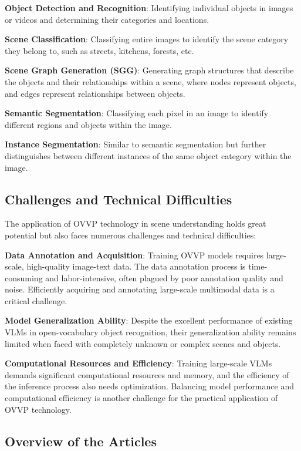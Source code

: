 \textbf{Object Detection and Recognition}: Identifying individual objects in images or videos and determining their categories and locations.

\textbf{Scene Classification}: Classifying entire images to identify the scene category they belong to, such as streets, kitchens, forests, etc.

\textbf{Scene Graph Generation (SGG)}: Generating graph structures that describe the objects and their relationships within a scene, where nodes represent objects, and edges represent relationships between objects.

\textbf{Semantic Segmentation}: Classifying each pixel in an image to identify different regions and objects within the image.

\textbf{Instance Segmentation}: Similar to semantic segmentation but further distinguishes between different instances of the same object category within the image.







\subsection{Challenges and Technical Difficulties}

The application of OVVP technology in scene understanding holds great potential but also faces numerous challenges and technical difficulties:

\textbf{Data Annotation and Acquisition}: Training OVVP models requires large-scale, high-quality image-text data. The data annotation process is time-consuming and labor-intensive, often plagued by poor annotation quality and noise. Efficiently acquiring and annotating large-scale multimodal data is a critical challenge.

\textbf{Model Generalization Ability}: Despite the excellent performance of existing VLMs in open-vocabulary object recognition, their generalization ability remains limited when faced with completely unknown or complex scenes and objects.

\textbf{Computational Resources and Efficiency}: Training large-scale VLMs demands significant computational resources and memory, and the efficiency of the inference process also needs optimization. Balancing model performance and computational efficiency is another challenge for the practical application of OVVP technology.


\subsection{Overview of the Articles}

